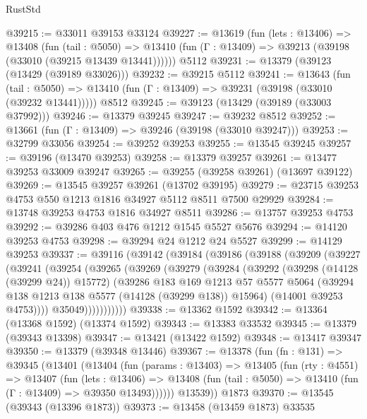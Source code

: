 \begin{lexlean}{RustStd}
\begin{coremodule}
@39215 := @33011 @39153 @33124
@39227 := @13619
    (fun (lets : @13406) =>
    @13408
      (fun (tail : @5050) =>
      @13410 (fun (Γ : @13409) => @39213 (@39198 (@33010 (@39215 @13439 @13441))))))
    @5112
@39231 := @13379 (@39123 (@13429 (@39189 @33026)))
@39232 := @39215 @5112
@39241 := @13643
    (fun (tail : @5050) => @13410 (fun (Γ : @13409) => @39231 (@39198 (@33010 (@39232 @13441)))))
    @8512
@39245 := @39123 (@13429 (@39189 (@33003 @37992)))
@39246 := @13379 @39245
@39247 := @39232 @8512
@39252 := @13661 (fun (Γ : @13409) => @39246 (@39198 (@33010 @39247)))
@39253 := @32799 @33056
@39254 := @39252 @39253
@39255 := @13545 @39245
@39257 := @39196 (@13470 @39253)
@39258 := @13379 @39257
@39261 := @13477 @39253 @33009 @39247
@39265 := @39255 (@39258 @39261) (@13697 @39122)
@39269 := @13545 @39257 @39261 (@13702 @39195)
@39279 := @23715 @39253 @4753 @550 @1213 @1816 @34927 @5112 @8511 @7500 @29929
@39284 := @13748 @39253 @4753 @1816 @34927 @8511
@39286 := @13757 @39253 @4753
@39292 := @39286 @403 @476 @1212 @1545 @5527 @5676
@39294 := @14120 @39253 @4753
@39298 := @39294 @24 @1212 @24 @5527
@39299 := @14129 @39253
@39337 := @39116
    (@39142
      (@39184
        (@39186
          (@39188
            (@39209
              (@39227
                (@39241
                  (@39254
                    (@39265
                      (@39269
                        (@39279
                          (@39284
                            (@39292
                              (@39298 (@14128 (@39299 @24)) @15772)
                              (@39286
                                @183
                                @169
                                @1213
                                @57
                                @5577
                                @5064
                                (@39294 @138 @1213 @138 @5577 (@14128 (@39299 @138)) @15964)
                                (@14001 @39253 @4753))))
                          @35049)))))))))))
@39338 := @13362 @1592
@39342 := @13364 (@13368 @1592) (@13374 @1592)
@39343 := @13383 @33532
@39345 := @13379 (@39343 @13398)
@39347 := @13421 (@13422 @1592)
@39348 := @13417 @39347
@39350 := @13379 (@39348 @13446)
@39367 := @13378
    (fun (fn : @131) =>
    @39345
      (@13401
        (@13404
          (fun (params : @13403) =>
          @13405
            (fun (rty : @4551) =>
            @13407
              (fun (lets : @13406) =>
              @13408 (fun (tail : @5050) => @13410 (fun (Γ : @13409) => @39350 @13493))))))
        @13539))
    @1873
@39370 := @13545 (@39343 (@13396 @1873))
@39373 := @13458 (@13459 @1873) @33535

\end{coremodule}
\end{lexlean}
